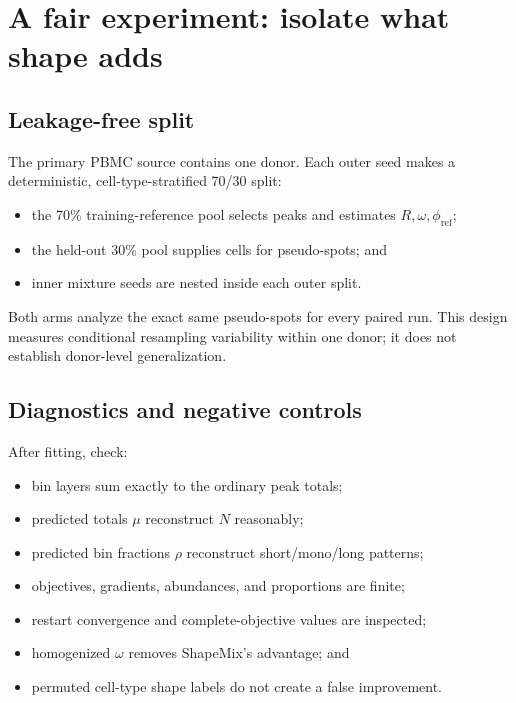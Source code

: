 \documentclass[11pt]{article}
\begin{document}
\section{A fair experiment: isolate what shape adds}

\subsection{Leakage-free split}

The primary PBMC source contains one donor. Each outer seed makes a deterministic,
cell-type-stratified 70/30 split:

\begin{itemize}[leftmargin=2em]
  \item the 70\% training-reference pool selects peaks and estimates
  \(R,\omega,\phi_{\mathrm{ref}}\);
  \item the held-out 30\% pool supplies cells for pseudo-spots; and
  \item inner mixture seeds are nested inside each outer split.
\end{itemize}

Both arms analyze the exact same pseudo-spots for every paired run. This design
measures conditional resampling variability within one donor; it does not establish
donor-level generalization.

\subsection{Diagnostics and negative controls}

After fitting, check:

\begin{itemize}[leftmargin=2em]
  \item bin layers sum exactly to the ordinary peak totals;
  \item predicted totals \(\mu\) reconstruct \(N\) reasonably;
  \item predicted bin fractions \(\rho\) reconstruct short/mono/long patterns;
  \item objectives, gradients, abundances, and proportions are finite;
  \item restart convergence and complete-objective values are inspected;
  \item homogenized \(\omega\) removes ShapeMix's advantage; and
  \item permuted cell-type shape labels do not create a false improvement.
\end{itemize}
\end{document}
